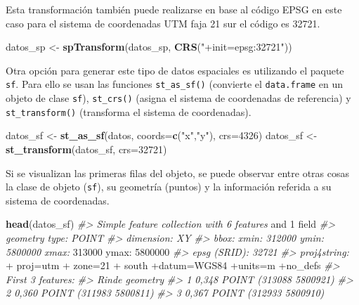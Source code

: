 \documentclass[11pt,b5paper,]{krantz}
\newenvironment{Shaded}{}{}
\newcommand{\KeywordTok}[1]{\textcolor[rgb]{0.00,0.44,0.13}{\textbf{#1}}}
\newcommand{\DataTypeTok}[1]{\textcolor[rgb]{0.56,0.13,0.00}{#1}}
\newcommand{\DecValTok}[1]{\textcolor[rgb]{0.25,0.63,0.44}{#1}}
\newcommand{\StringTok}[1]{\textcolor[rgb]{0.25,0.44,0.63}{#1}}
\newcommand{\CommentTok}[1]{\textcolor[rgb]{0.38,0.63,0.69}{\textit{#1}}}
\newcommand{\OperatorTok}[1]{\textcolor[rgb]{0.40,0.40,0.40}{#1}}
\newcommand{\NormalTok}[1]{#1}
\begin{document}
Esta transformación también puede realizarse en base al código EPSG en
este caso para el sistema de coordenadas UTM faja 21 sur el código es
32721.

\begin{Shaded}
\begin{Highlighting}[]
\NormalTok{datos_sp <-}\StringTok{ }\KeywordTok{spTransform}\NormalTok{(datos_sp, }
                        \KeywordTok{CRS}\NormalTok{(}\StringTok{"+init=epsg:32721"}\NormalTok{))}
\end{Highlighting}
\end{Shaded}

Otra opción para generar este tipo de datos espaciales es utilizando el
paquete \texttt{sf}. Para ello se usan las funciones
\texttt{st\_as\_sf()} (convierte el \texttt{data.frame} en un objeto de
clase \texttt{sf}), \texttt{st\_crs()} (asigna el sistema de coordenadas
de referencia) y \texttt{st\_transform()} (transforma el sistema de
coordenadas).

\begin{Shaded}
\begin{Highlighting}[]
\NormalTok{datos_sf <-}\StringTok{ }\KeywordTok{st_as_sf}\NormalTok{(datos, }\DataTypeTok{coords=}\KeywordTok{c}\NormalTok{(}\StringTok{"x"}\NormalTok{,}\StringTok{"y"}\NormalTok{), }
                     \DataTypeTok{crs=}\DecValTok{4326}\NormalTok{)}
\NormalTok{datos_sf <-}\StringTok{ }\KeywordTok{st_transform}\NormalTok{(datos_sf, }\DataTypeTok{crs=}\DecValTok{32721}\NormalTok{)}
\end{Highlighting}
\end{Shaded}

Si se visualizan las primeras filas del objeto, se puede observar entre
otras cosas la clase de objeto (\texttt{sf}), su geometría (puntos) y la
información referida a su sistema de coordenadas.

\begin{Shaded}
\begin{Highlighting}[]
\KeywordTok{head}\NormalTok{(datos_sf)}
\CommentTok{#> Simple feature collection with 6 features}
\NormalTok{and }\DecValTok{1}\NormalTok{ field}
\CommentTok{#> geometry type: POINT}
\CommentTok{#> dimension: XY}
\CommentTok{#> bbox: xmin: 312000 ymin: 5800000 xmax:}
\DecValTok{313000}\NormalTok{ ymax}\OperatorTok{:}\StringTok{ }\DecValTok{5800000}
\CommentTok{#> epsg (SRID): 32721}
\CommentTok{#> proj4string: }
    \OperatorTok{+}\StringTok{ }\NormalTok{proj=utm }
    \OperatorTok{+}\StringTok{ }\NormalTok{zone=}\DecValTok{21} 
    \OperatorTok{+}\StringTok{ }\NormalTok{south}
\OperatorTok{+}\NormalTok{datum=WGS84 }\OperatorTok{+}\NormalTok{units=m }\OperatorTok{+}\NormalTok{no_defs}
\CommentTok{#> First 3 features:}
\CommentTok{#> Rinde geometry}
\CommentTok{#> 1 0,348 POINT (313088 5800921)}
\CommentTok{#> 2 0,360 POINT (311983 5800811)}
\CommentTok{#> 3 0,367 POINT (312933 5800910)}
\end{Highlighting}
\end{Shaded}
\end{document}
